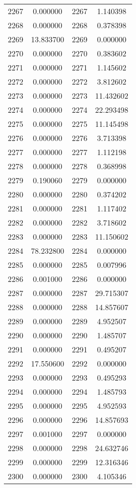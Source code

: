 \documentclass[12pt]{article}
\begin{document}
\begin{longtable}{@{}cccc@{}}
2267 & 0.000000 & 2267 & 1.140398 \\
2268 & 0.000000 & 2268 & 0.378398 \\
2269 & 13.833700 & 2269 & 0.000000 \\
2270 & 0.000000 & 2270 & 0.383602 \\
2271 & 0.000000 & 2271 & 1.145602 \\
2272 & 0.000000 & 2272 & 3.812602 \\
2273 & 0.000000 & 2273 & 11.432602 \\
2274 & 0.000000 & 2274 & 22.293498 \\
2275 & 0.000000 & 2275 & 11.145498 \\
2276 & 0.000000 & 2276 & 3.713398 \\
2277 & 0.000000 & 2277 & 1.112198 \\
2278 & 0.000000 & 2278 & 0.368998 \\
2279 & 0.190060 & 2279 & 0.000000 \\
2280 & 0.000000 & 2280 & 0.374202 \\
2281 & 0.000000 & 2281 & 1.117402 \\
2282 & 0.000000 & 2282 & 3.718602 \\
2283 & 0.000000 & 2283 & 11.150602 \\
2284 & 78.232800 & 2284 & 0.000000 \\
2285 & 0.000000 & 2285 & 0.007996 \\
2286 & 0.001000 & 2286 & 0.000000 \\
2287 & 0.000000 & 2287 & 29.715307 \\
2288 & 0.000000 & 2288 & 14.857607 \\
2289 & 0.000000 & 2289 & 4.952507 \\
2290 & 0.000000 & 2290 & 1.485707 \\
2291 & 0.000000 & 2291 & 0.495207 \\
2292 & 17.550600 & 2292 & 0.000000 \\
2293 & 0.000000 & 2293 & 0.495293 \\
2294 & 0.000000 & 2294 & 1.485793 \\
2295 & 0.000000 & 2295 & 4.952593 \\
2296 & 0.000000 & 2296 & 14.857693 \\
2297 & 0.001000 & 2297 & 0.000000 \\
2298 & 0.000000 & 2298 & 24.632746 \\
2299 & 0.000000 & 2299 & 12.316346 \\
2300 & 0.000000 & 2300 & 4.105346 \\

\end{longtable}
\end{document}
